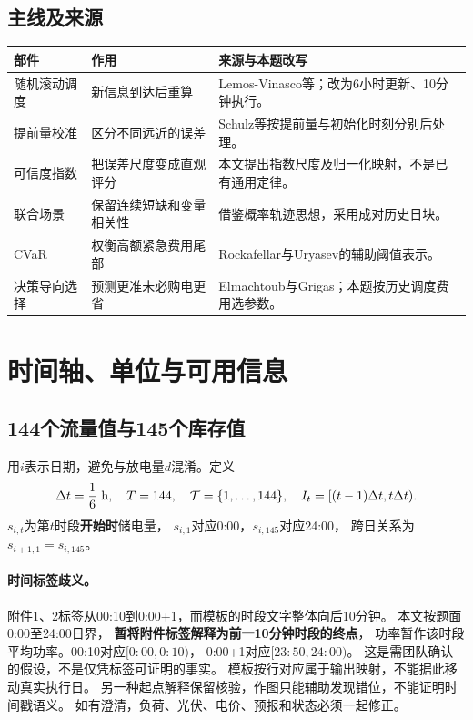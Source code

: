 \documentclass[UTF8,11pt]{ctexart}
\begin{document}
\subsection{主线及来源}
\begin{longtable}{p{2.6cm}p{5.1cm}p{6.1cm}}
\toprule 部件 & 作用 & 来源与本题改写\\ \midrule
\endhead
随机滚动调度 & 新信息到达后重算 & Lemos-Vinasco等\cite{lemos2022}；改为6小时更新、10分钟执行。\\
提前量校准 & 区分不同远近的误差 & Schulz等\cite{schulz2021}按提前量与初始化时刻分别后处理。\\
可信度指数 & 把误差尺度变成直观评分 & 本文提出指数尺度及归一化映射，不是已有通用定律。\\
联合场景 & 保留连续短缺和变量相关性 & 借鉴概率轨迹思想\cite{lemos2022,gneiting2023}，采用成对历史日块。\\
CVaR & 权衡高额紧急费用尾部 & Rockafellar与Uryasev\cite{rockafellar2000}的辅助阈值表示。\\
决策导向选择 & 预测更准未必购电更省 & Elmachtoub与Grigas\cite{elmachtoub2022}；本题按历史调度费用选参数。\\
\bottomrule
\end{longtable}

\section{时间轴、单位与可用信息}
\subsection{144个流量值与145个库存值}
用$i$表示日期，避免与放电量$d$混淆。定义
\begin{equation}
 \Delta t=\frac16\ {\rm h},\quad T=144,\quad
 \mathcal T=\{1,\ldots,144\},\quad I_t=[(t-1)\Delta t,t\Delta t).
\end{equation}
$s_{i,t}$为第$t$时段\textbf{开始时}储电量，
$s_{i,1}$对应0:00，$s_{i,145}$对应24:00，
跨日关系为$s_{i+1,1}=s_{i,145}$。

\paragraph{时间标签歧义。}
附件1、2标签从00:10到0:00+1，而模板的时段文字整体向后10分钟。
本文按题面0:00至24:00日界，
\textbf{暂将附件标签解释为前一10分钟时段的终点}，
功率暂作该时段平均功率。00:10对应$[0{:}00,0{:}10)$，
0:00+1对应$[23{:}50,24{:}00)$。
这是需团队确认的假设，不是仅凭标签可证明的事实。
模板按行对应属于输出映射，不能据此移动真实执行日。
另一种起点解释保留核验，作图只能辅助发现错位，不能证明时间戳语义。
如有澄清，负荷、光伏、电价、预报和状态必须一起修正。
\end{document}
